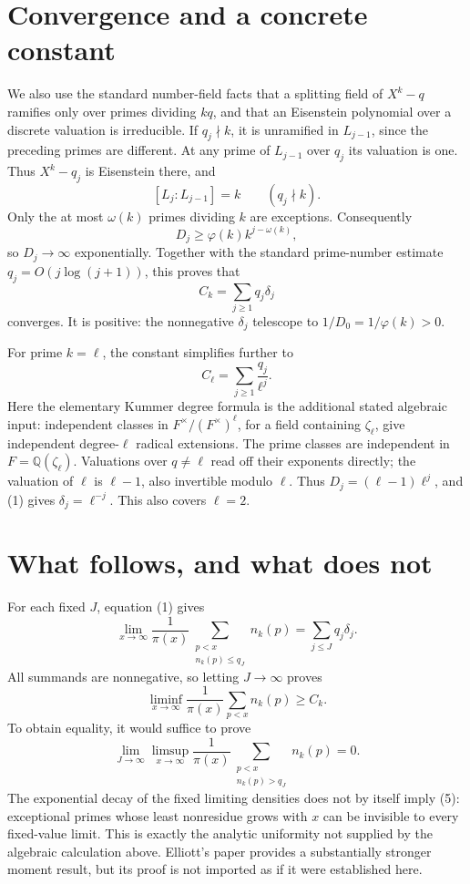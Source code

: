 \documentclass[11pt]{article}
\begin{document}
\section*{Convergence and a concrete constant}
We also use the standard number-field facts that a splitting field of $X^k-q$ ramifies only over primes dividing $kq$, and that an Eisenstein polynomial over a discrete valuation is irreducible. If $q_j\nmid k$, it is unramified in $L_{j-1}$, since the preceding primes are different. At any prime of $L_{j-1}$ over $q_j$ its valuation is one. Thus $X^k-q_j$ is Eisenstein there, and
\[
 [L_j:L_{j-1}]=k\qquad(q_j\nmid k).
\]
Only the at most $\omega(k)$ primes dividing $k$ are exceptions. Consequently
\[
 D_j\ge\varphi(k)k^{j-\omega(k)},
\]
so $D_j\to\infty$ exponentially. Together with the standard prime-number estimate $q_j=O(j\log(j+1))$, this proves that
\[
 C_k=\sum_{j\ge1}q_j\delta_j \tag{2}
\]
converges. It is positive: the nonnegative $\delta_j$ telescope to $1/D_0=1/\varphi(k)>0$.

For prime $k=\ell$, the constant simplifies further to
\[
 C_\ell=\sum_{j\ge1}\frac{q_j}{\ell^j}. \tag{3}
\]
Here the elementary Kummer degree formula is the additional stated algebraic input: independent classes in $F^\times/(F^\times)^\ell$, for a field containing $\zeta_\ell$, give independent degree-$\ell$ radical extensions. The prime classes are independent in $F=\mathbb Q(\zeta_\ell)$. Valuations over $q\ne\ell$ read off their exponents directly; the valuation of $\ell$ is $\ell-1$, also invertible modulo $\ell$. Thus $D_j=(\ell-1)\ell^j$, and (1) gives $\delta_j=\ell^{-j}$. This also covers $\ell=2$.

\section*{What follows, and what does not}
For each fixed $J$, equation (1) gives
\[
 \lim_{x\to\infty}\frac1{\pi(x)}
 \sum_{\substack{p<x\\n_k(p)\le q_J}}n_k(p)
 =\sum_{j\le J}q_j\delta_j.
\]
All summands are nonnegative, so letting $J\to\infty$ proves
\[
 \liminf_{x\to\infty}\frac1{\pi(x)}\sum_{p<x}n_k(p)\ge C_k. \tag{4}
\]
To obtain equality, it would suffice to prove
\[
 \lim_{J\to\infty}\limsup_{x\to\infty}
 \frac1{\pi(x)}\sum_{\substack{p<x\\n_k(p)>q_J}}n_k(p)=0. \tag{5}
\]
The exponential decay of the fixed limiting densities does not by itself imply (5): exceptional primes whose least nonresidue grows with $x$ can be invisible to every fixed-value limit. This is exactly the analytic uniformity not supplied by the algebraic calculation above. Elliott's paper provides a substantially stronger moment result, but its proof is not imported as if it were established here.
\end{document}
